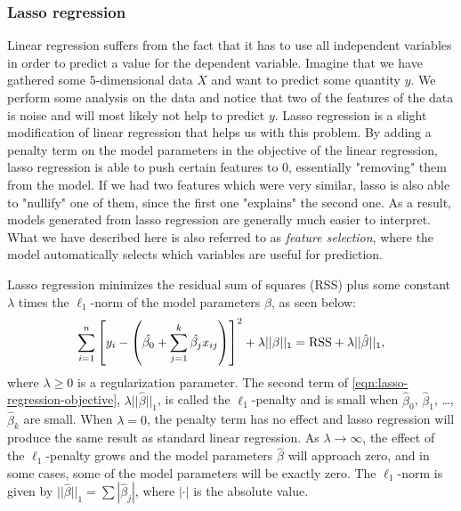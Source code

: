 \subsubsection{Lasso regression}
\label{sec:lasso-regression}
Linear regression suffers from the fact that it has to use all independent variables in order to predict a value for the dependent variable. Imagine that we have gathered some $5$-dimensional data $X$ and want to predict some quantity $y$. We perform some analysis on the data and notice that two of the features of the data is noise and will most likely not help to predict $y$. Lasso regression is a slight modification of linear regression that helps us with this problem. By adding a penalty term on the model parameters in the objective of the linear regression, lasso regression is able to push certain features to 0, essentially "removing" them from the model. If we had two features which were very similar, lasso is also able to "nullify" one of them, since the first one "explains" the second one. As a result, models generated from lasso regression are generally much easier to interpret. What we have described here is also referred to as \textit{feature selection}, where the model automatically selects which variables are useful for prediction.

Lasso regression minimizes the residual sum of squares (RSS) plus some constant $\lambda$ times the $\ell_1$-norm of the model parameters $\beta$, as seen below:
\begin{align}
    \sum\limits_{i=1}^{n}{\left[y_i - \left(\hat{\beta_0} +  \sum\limits_{j=1}^{k}{\hat{\beta_j}x_{ij}}\right)\right]^2} + \lambda ||\beta||_1 = \text{RSS} + \lambda ||\hat{\beta}||_1,
    \label{eqn:lasso-regression-objective}
\end{align}
where $\lambda \geq 0$ is a regularization parameter. The second term of \cref{eqn:lasso-regression-objective}, $\lambda ||\hat{\beta}||_1$, is called the $\ell_1$-penalty and is small when $\hat{\beta}_0$, $\hat{\beta}_1$, \ldots, $\hat{\beta}_k$ are small. When $\lambda = 0$, the penalty term has no effect and lasso regression will produce the same result as standard linear regression. As $\lambda \rightarrow \infty$, the effect of the $\ell_1$-penalty grows and the model parameters $\hat{\beta}$ will approach zero, and in some cases, some of the model parameters will be exactly zero. The $\ell_1$-norm is given by $||\hat{\beta}||_1 = \sum |\hat{\beta}_j|$, where $|\cdot|$ is the absolute value.


